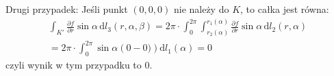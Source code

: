 \documentclass[11pt]{scrartcl}
\begin{document}
    Drugi przypadek:
    Jeśli punkt $(0, 0, 0)$ nie należy do $K$, to całka jest równa:
    \begin{gather*}
        \int_{K'} \frac{\partial f}{\partial r} \sin \alpha \, \mathrm{d} l_3 (r,\alpha , \beta ) 
        = 2 \pi \cdot \int_0^{2\pi} \int_{r_2(\alpha)}^{r_1(\alpha)} \frac{\partial f}{\partial r} \sin \alpha  \, \mathrm{d} l_2 (r,\alpha) \\
        = 2 \pi \cdot \int_0^{2\pi} \sin \alpha \left ( 0 - 0) \right ) \mathrm{d} l_1 (\alpha ) 
        = 0
    \end{gather*}
    czyli wynik w tym przypadku to $0$.
    
    
\end{document}
